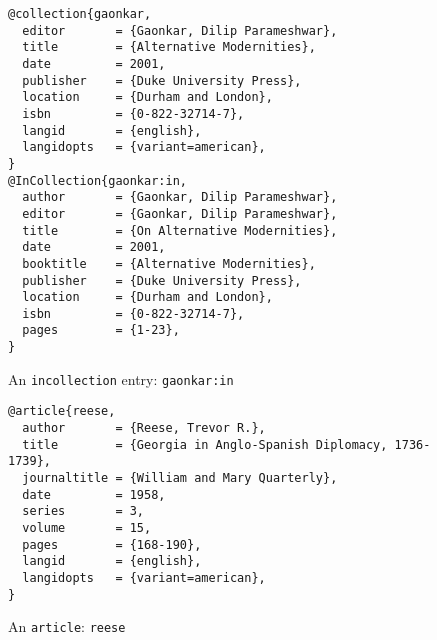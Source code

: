 \begin{figure}
\begin{Verbatim}[frame=single, fontsize=\small]
@collection{gaonkar,
  editor       = {Gaonkar, Dilip Parameshwar},
  title        = {Alternative Modernities},
  date         = 2001,
  publisher    = {Duke University Press},
  location     = {Durham and London},
  isbn         = {0-822-32714-7},
  langid       = {english},
  langidopts   = {variant=american},
}
@InCollection{gaonkar:in,
  author       = {Gaonkar, Dilip Parameshwar},
  editor       = {Gaonkar, Dilip Parameshwar},
  title        = {On Alternative Modernities},
  date         = 2001,
  booktitle    = {Alternative Modernities},
  publisher    = {Duke University Press},
  location     = {Durham and London},
  isbn         = {0-822-32714-7},
  pages        = {1-23},
}
\end{Verbatim}
\caption{An \texttt{incollection} entry: \texttt{gaonkar:in}\label{eg:incollection}}
\end{figure}

\begin{figure}
\begin{Verbatim}[frame=single, fontsize=\small]
@article{reese,
  author       = {Reese, Trevor R.},
  title        = {Georgia in Anglo-Spanish Diplomacy, 1736-1739},
  journaltitle = {William and Mary Quarterly},
  date         = 1958,
  series       = 3,
  volume       = 15,
  pages        = {168-190},
  langid       = {english},
  langidopts   = {variant=american},
}
\end{Verbatim}
\caption{An \texttt{article}: \texttt{reese}\label{eg:article}}
\end{figure}



\clearpage

















